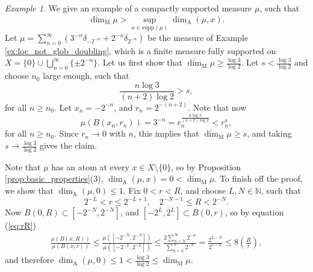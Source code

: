 \documentclass{PRM}
\newcommand{\field}[1]{\mathbb{#1}}
\newcommand{\N}{\field{N}}
\newcommand{\updim}{\overline{\dim}}
\theoremstyle{plain}
\theoremstyle{definition}
\theoremstyle{remark}
\newtheorem{example}[thm]{Example}
\begin{document}
\begin{example}
We give an example of a compactly supported measure $\mu$, such that
\begin{equation*}
    \updim_{\mathrm{M}}\mu>\sup_{x\in\mathrm{supp}(\mu)}\dim_{\mathrm{A}}(\mu,x).
\end{equation*}
Let $\mu=\sum_{n=0}^{\infty}(3^{-n}\delta_{-2^{-n}}+2^{-n}\delta_{2^{-n}})$ be the measure of Example \ref{ex:loc_not_glob_doubling}, which is a finite measure fully supported on $X=\{0\}\cup\bigcup_{n=0}^{\infty}\{\pm 2^{-n}\}$. Let us first show that $\updim_{\mathrm{M}}\mu\geq \frac{\log 3}{\log 2}$. Let $s<\frac{\log 3}{\log 2}$ and choose $n_0$ large enough, such that
\begin{equation*}
    \frac{n\log3}{(n+2)\log 2}> s,
\end{equation*}
for all $n\geq n_0$. Let $x_n=-2^{-n}$, and $r_n=2^{-(n+2)}$. Note that now
\begin{equation*}
    \mu(B(x_n,r_n))=3^{-n}=r_n^{\frac{n\log 3}{(n+2)\log 2}}< r_n^{s},
\end{equation*}
for all $n\geq n_0$. Since $r_n\to 0$ with $n$, this implies that $\updim_{\mathrm{M}}\mu\geq s$, and taking $s\to\frac{\log 3}{\log 2}$ gives the claim.

Note that $\mu$ has an atom at every $x\in X\setminus\{0\}$, so by Proposition \ref{prop:basic_properties}(3), $\dim_{\mathrm{A}}(\mu,x)=0<\updim_{\mathrm{M}}\mu$. To finish off the proof, we show that $\dim_{\mathrm{A}}(\mu,0)\leq1$. Fix $0<r<R$, and choose $L,N\in \N$, such that
\begin{equation}\label{eq:rR}
    2^{-L}< r \leq 2^{-L+1},\quad2^{-N-1}\leq R < 2^{-N}.
\end{equation}
Now $B(0,R)\subset [-2^{-N},2^{-N}]$, and $[-2^{L},2^{L}]\subset B(0,r)$, so by equation (\ref{eq:rR})
\begin{align*}
    \frac{\mu(B(x,R))}{\mu(B(x,r))}\leq \frac{\mu([-2^{-N},2^{-N}])}{\mu([-2^{-L},2^{-L}])}\leq\frac{2\sum_{n=N}^{\infty}2^{-n}}{\sum_{n=L}^{\infty}2^{-n}}=\frac{2^{2-N}}{2^{1-L}}\leq 8\left(\frac{R}{r}\right),
\end{align*}
and therefore $\dim_{\mathrm{A}}(\mu,0)\leq1<\frac{\log3}{\log 2}\leq \updim_{\mathrm{M}}\mu$.
\end{example}
\end{document}
